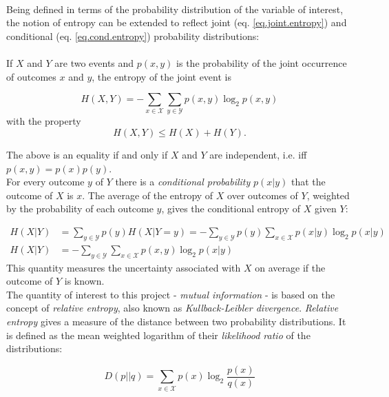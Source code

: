\documentclass[12pt]{extarticle}
\begin{document}
\noindent \\ Being defined in terms of the probability distribution of
the variable of interest, the notion of entropy can be extended to
reflect joint (eq. \ref{eq.joint.entropy}) and conditional (eq. \ref{eq.cond.entropy}) probability
distributions:\\ \\ If $X$ and $Y$ are two events and $p(x,y)$ is the
probability of the joint occurrence of outcomes $x$ and $y$, the
entropy of the joint event is

\begin{equation}
H(X,Y)=-\sum_{x \in \mathcal{X}}\sum_{y \in\mathcal{Y}} p(x,y)\log_2 p(x,y)
\label{eq.joint.entropy}
\end{equation}
with the property
\begin{equation}
H(X,Y)\leq H(X) + H(Y).
\end{equation}

\noindent
The above is an equality if and only if $X$ and $Y$ are independent, i.e. iff $p(x,y)=p(x)p(y)$.\\

\noindent
For every outcome $y$ of $Y$ there is a \textit{conditional 
probability} $p(x|y)$ that the outcome of $X$ is $x$. The average of
the entropy of $X$ over outcomes of $Y$, weighted by the probability
of each outcome $y$, gives the conditional entropy of $X$ given $Y$:

\begin{equation}
\begin{aligned}
H(X|Y) &= \sum_{y\in\mathcal{Y}} p(y)H(X|Y=y)= -\sum_{y\in\mathcal{Y}}p(y)\sum_{x\in\mathcal{X}}p(x|y)\log_2 p(x|y)\\
H(X|Y) &=-\sum_{y\in\mathcal{Y}}\sum_{x\in\mathcal{X}}p(x,y)\log_2 p(x|y)
\end{aligned}
\label{eq.cond.entropy}
\end{equation}
This quantity measures the uncertainty associated with $X$ on average
if the outcome of $Y$ is known.\\

\noindent
The quantity of interest to this project - \textit{mutual information}
- is based on the concept of \textit{relative entropy}, also known as
\textit{Kullback-Leibler divergence}. \textit{Relative entropy} gives
a measure of the distance between two probability distributions. It is
defined as the mean weighted logarithm of their \textit{likelihood
  ratio} of the distributions:
 
\begin{equation}
D(p||q)=\sum_{x\in\mathcal{X}}p(x)\log_2 \frac{p(x)}{q(x)}
\end{equation}
\end{document}
